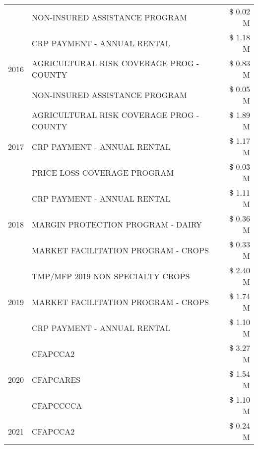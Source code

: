 \begin{tabular}{llr}
 & NON-INSURED ASSISTANCE PROGRAM & \$ 0.02 M \\
\cline{1-3}
\multirow[t]{3}{*}{2016} & CRP PAYMENT - ANNUAL RENTAL & \$ 1.18 M \\
 & AGRICULTURAL RISK COVERAGE PROG - COUNTY & \$ 0.83 M \\
 & NON-INSURED ASSISTANCE PROGRAM & \$ 0.05 M \\
\cline{1-3}
\multirow[t]{3}{*}{2017} & AGRICULTURAL RISK COVERAGE PROG - COUNTY & \$ 1.89 M \\
 & CRP PAYMENT - ANNUAL RENTAL & \$ 1.17 M \\
 & PRICE LOSS COVERAGE PROGRAM & \$ 0.03 M \\
\cline{1-3}
\multirow[t]{3}{*}{2018} & CRP PAYMENT - ANNUAL RENTAL & \$ 1.11 M \\
 & MARGIN PROTECTION PROGRAM - DAIRY & \$ 0.36 M \\
 & MARKET FACILITATION PROGRAM - CROPS & \$ 0.33 M \\
\cline{1-3}
\multirow[t]{3}{*}{2019} & TMP/MFP 2019 NON SPECIALTY CROPS & \$ 2.40 M \\
 & MARKET FACILITATION PROGRAM - CROPS & \$ 1.74 M \\
 & CRP PAYMENT - ANNUAL RENTAL & \$ 1.10 M \\
\cline{1-3}
\multirow[t]{3}{*}{2020} & CFAPCCA2 & \$ 3.27 M \\
 & CFAPCARES & \$ 1.54 M \\
 & CFAPCCCCA & \$ 1.10 M \\
\cline{1-3}
2021 & CFAPCCA2 & \$ 0.24 M \\
\cline{1-3}
\bottomrule
\end{tabular}
